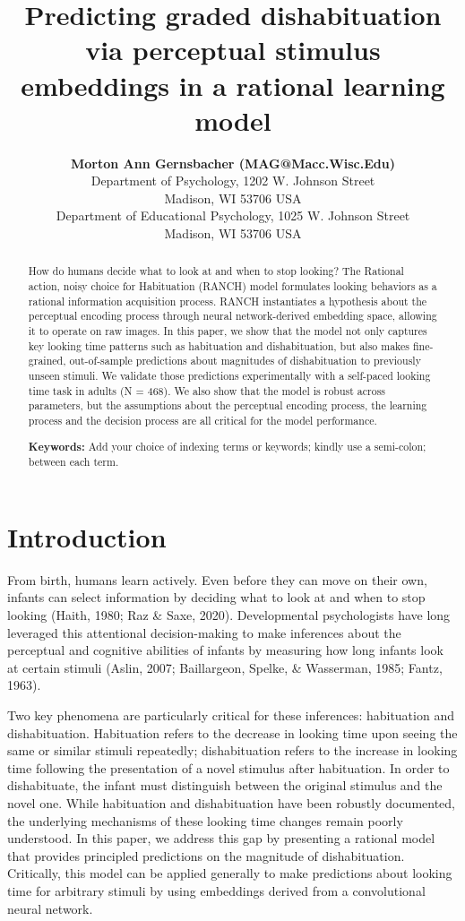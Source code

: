\documentclass[10pt, letterpaper]{article}
\title{Predicting graded dishabituation via perceptual stimulus
embeddings in a rational learning model}
\author{{\large \bf Morton Ann Gernsbacher (MAG@Macc.Wisc.Edu)} \\ Department of Psychology, 1202 W. Johnson Street \\ Madison, WI 53706 USA \AND {\large \bf Sharon J.~Derry (SDJ@Macc.Wisc.Edu)} \\ Department of Educational Psychology, 1025 W. Johnson Street \\ Madison, WI 53706 USA}
\begin{document}
\maketitle

\begin{abstract}
How do humans decide what to look at and when to stop looking? The
Rational action, noisy choice for Habituation (RANCH) model formulates
looking behaviors as a rational information acquisition process. RANCH
instantiates a hypothesis about the perceptual encoding process through
neural network-derived embedding space, allowing it to operate on raw
images. In this paper, we show that the model not only captures key
looking time patterns such as habituation and dishabituation, but also
makes fine-grained, out-of-sample predictions about magnitudes of
dishabituation to previously unseen stimuli. We validate those
predictions experimentally with a self-paced looking time task in adults
(N = 468). We also show that the model is robust across parameters, but
the assumptions about the perceptual encoding process, the learning
process and the decision process are all critical for the model
performance.

\textbf{Keywords:}
Add your choice of indexing terms or keywords; kindly use a semi-colon;
between each term.
\end{abstract}

\hypertarget{introduction}{%
\section{Introduction}\label{introduction}}

From birth, humans learn actively. Even before they can move on their
own, infants can select information by deciding what to look at and when
to stop looking (Haith, 1980; Raz \& Saxe, 2020). Developmental
psychologists have long leveraged this attentional decision-making to
make inferences about the perceptual and cognitive abilities of infants
by measuring how long infants look at certain stimuli (Aslin, 2007;
Baillargeon, Spelke, \& Wasserman, 1985; Fantz, 1963).

Two key phenomena are particularly critical for these inferences:
habituation and dishabituation. Habituation refers to the decrease in
looking time upon seeing the same or similar stimuli repeatedly;
dishabituation refers to the increase in looking time following the
presentation of a novel stimulus after habituation. In order to
dishabituate, the infant must distinguish between the original stimulus
and the novel one. While habituation and dishabituation have been
robustly documented, the underlying mechanisms of these looking time
changes remain poorly understood. In this paper, we address this gap by
presenting a rational model that provides principled predictions on the
magnitude of dishabituation. Critically, this model can be applied
generally to make predictions about looking time for arbitrary stimuli
by using embeddings derived from a convolutional neural network.
\end{document}
